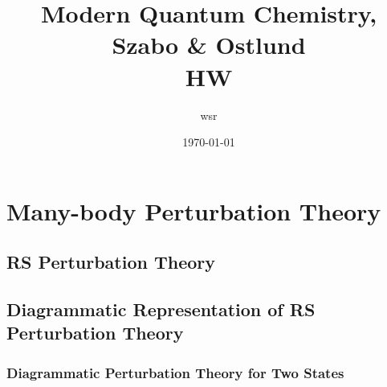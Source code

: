 \documentclass[a4paper]{article}
\title{\textbf{Modern Quantum Chemistry, Szabo \& Ostlund}\\HW}
\author{wsr
\vspace{5pt}\\
}
\date{\today} %
\begin{document}

\maketitle

\tableofcontents

\newpage

\setcounter{section}{5}

\section{Many-body Perturbation Theory}
\subsection{RS Perturbation Theory}

\subsection{Diagrammatic Representation of RS Perturbation Theory}
\subsubsection{Diagrammatic Perturbation Theory for Two States}
~\\
\end{document}
